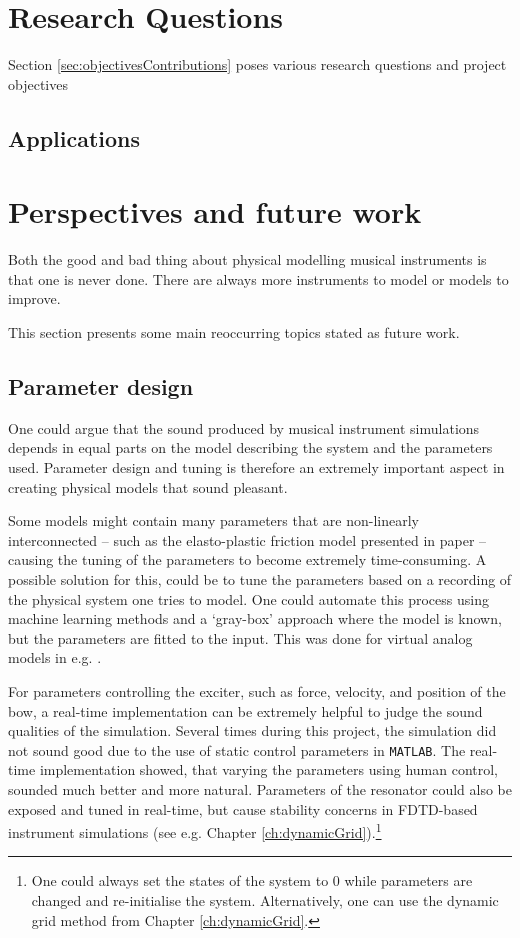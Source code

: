 \section{Research Questions}

Section \ref{sec:objectivesContributions} poses various research questions and project objectives 




\subsection{Applications}



\section{Perspectives and future work}
Both the good and bad thing about physical modelling musical instruments is that one is never done. There are always more instruments to model or models to improve. 

This section presents some main reoccurring topics stated as future work.


\subsection{Parameter design}\label{sec:parameterDesign}
One could argue that the sound produced by musical instrument simulations depends in equal parts on the model describing the system and the parameters used. Parameter design and tuning is therefore an extremely important aspect in creating physical models that sound pleasant. 

Some models might contain many parameters that are non-linearly interconnected -- such as the elasto-plastic friction model presented in paper \citeP[C] -- causing the tuning of the parameters to become extremely time-consuming. A possible solution for this, could be to tune the parameters based on a recording of the physical system one tries to model. 
One could automate this process using machine learning methods and a `gray-box' approach where the model is known, but the parameters are fitted to the input. This was done for virtual analog models in e.g. \cite{Eichas2017, Parker2019}. 

For parameters controlling the exciter, such as force, velocity, and position of the bow, a real-time implementation can be extremely helpful to judge the sound qualities of the simulation. Several times during this project, the simulation did not sound good due to the use of static control parameters in \texttt{MATLAB}. The real-time implementation showed, that varying the parameters using human control, sounded much better and more natural. Parameters of the resonator could also be exposed and tuned in real-time, but cause stability concerns in FDTD-based instrument simulations (see e.g. Chapter \ref{ch:dynamicGrid}).\footnote{One could always set the states of the system to 0 while parameters are changed and re-initialise the system. Alternatively, one can use the dynamic grid method from Chapter \ref{ch:dynamicGrid}.}

